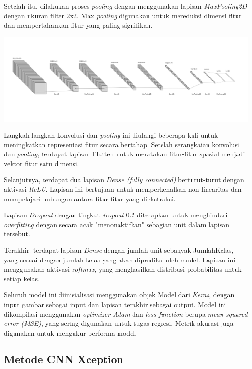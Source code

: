 Setelah itu, dilakukan proses \textit{pooling} dengan menggunakan lapisan \textit{MaxPooling2D} dengan ukuran filter 2x2. Max \textit{pooling} digunakan untuk mereduksi dimensi fitur dan mempertahankan fitur yang paling signifikan.

\begin{center}
	\includegraphics[width=0.7\linewidth]{gambar/bener/ArsitekturModelCNN.png}
	\label{fig:layerCNN}
\end{center}

Langkah-langkah konvolusi dan \textit{pooling} ini diulangi beberapa kali untuk meningkatkan representasi fitur secara bertahap. Setelah serangkaian konvolusi dan \textit{pooling}, terdapat lapisan Flatten untuk meratakan fitur-fitur spasial menjadi vektor fitur satu dimensi.

Selanjutnya, terdapat dua lapisan \textit{{Dense} (fully connected)} berturut-turut dengan aktivasi \textit{ReLU}. Lapisan ini bertujuan untuk memperkenalkan non-linearitas dan mempelajari hubungan antara fitur-fitur yang diekstraksi.

Lapisan \textit{Dropout} dengan tingkat \textit{dropout} 0.2 diterapkan untuk menghindari \textit{overfitting} dengan secara acak "menonaktifkan" sebagian unit dalam lapisan tersebut.

Terakhir, terdapat lapisan {\textit{Dense}} dengan jumlah unit sebanyak JumlahKelas, yang sesuai dengan jumlah kelas yang akan diprediksi oleh model. Lapisan ini menggunakan aktivasi \textit{softmax}, yang menghasilkan distribusi probabilitas untuk setiap kelas.

Seluruh model ini diinisialisasi menggunakan objek Model dari \textit{Keras}, dengan input gambar sebagai input dan lapisan terakhir sebagai output. Model ini dikompilasi menggunakan \textit{optimizer Adam} dan \textit{loss function} berupa \textit{mean squared error (MSE)}, yang sering digunakan untuk tugas regresi. Metrik akurasi juga digunakan untuk mengukur performa model.

\subsection{Metode CNN Xception}

